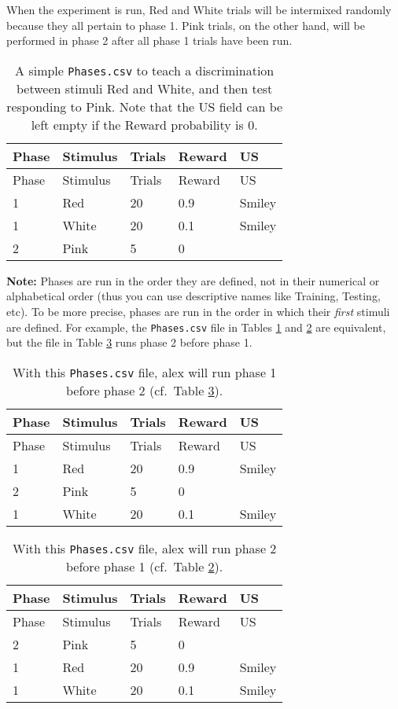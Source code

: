 \documentclass[11pt,]{article}
\begin{document}
When the experiment is run, Red and White trials will be intermixed
randomly because they all pertain to phase 1. Pink trials, on the other
hand, will be performed in phase 2 after all phase 1 trials have been
run.

\begin{longtable}[c]{@{}lllll@{}}
\caption{A simple \texttt{Phases.csv} to teach a discrimination between
stimuli Red and White, and then test responding to Pink. Note that the
US field can be left empty if the Reward probability is 0.
\label{phases}}\tabularnewline
\toprule
Phase & Stimulus & Trials & Reward & US\tabularnewline
\midrule
\endfirsthead
\toprule
Phase & Stimulus & Trials & Reward & US\tabularnewline
\midrule
\endhead
1 & Red & 20 & 0.9 & Smiley\tabularnewline
1 & White & 20 & 0.1 & Smiley\tabularnewline
2 & Pink & 5 & 0 &\tabularnewline
\bottomrule
\end{longtable}

\pagebreak

\textbf{Note:} Phases are run in the order they are defined, not in
their numerical or alphabetical order (thus you can use descriptive
names like Training, Testing, etc). To be more precise, phases are run
in the order in which their \emph{first} stimuli are defined. For
example, the \texttt{Phases.csv} file in Tables \ref{phases} and
\ref{phases-order1} are equivalent, but the file in Table
\ref{phases-order2} runs phase 2 before phase 1.

\begin{longtable}[c]{@{}lllll@{}}
\caption{With this \texttt{Phases.csv} file, alex will run phase 1
before phase 2 (cf.~Table \ref{phases-order2}).
\label{phases-order1}}\tabularnewline
\toprule
Phase & Stimulus & Trials & Reward & US\tabularnewline
\midrule
\endfirsthead
\toprule
Phase & Stimulus & Trials & Reward & US\tabularnewline
\midrule
\endhead
1 & Red & 20 & 0.9 & Smiley\tabularnewline
2 & Pink & 5 & 0 &\tabularnewline
1 & White & 20 & 0.1 & Smiley\tabularnewline
\bottomrule
\end{longtable}

\begin{longtable}[c]{@{}lllll@{}}
\caption{With this \texttt{Phases.csv} file, alex will run phase 2
before phase 1 (cf.~Table \ref{phases-order1}).
\label{phases-order2}}\tabularnewline
\toprule
Phase & Stimulus & Trials & Reward & US\tabularnewline
\midrule
\endfirsthead
\toprule
Phase & Stimulus & Trials & Reward & US\tabularnewline
\midrule
\endhead
2 & Pink & 5 & 0 &\tabularnewline
1 & Red & 20 & 0.9 & Smiley\tabularnewline
1 & White & 20 & 0.1 & Smiley\tabularnewline
\bottomrule
\end{longtable}
\end{document}
